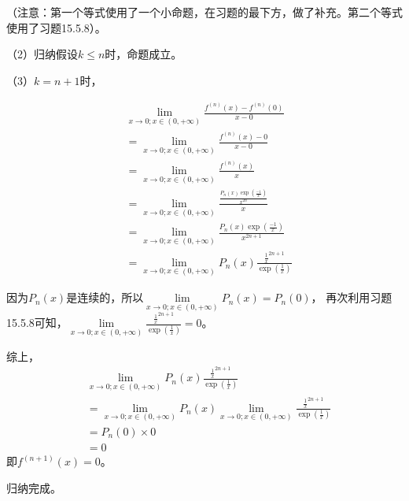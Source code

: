 \documentclass{article}
\begin{document}
\begin{itemize}
\begin{itemize}
                （注意：第一个等式使用了一个小命题，在习题的最下方，做了补充。第二个等式使用了习题15.5.8）。

                （2）归纳假设$k \leq n$时，命题成立。

                （3）$k = n + 1$时，

                \begin{align*}
                   & \lim\limits_{x \to 0; x \in (0, + \infty)} \frac{f^{(n)}(x) - f^{(n)}(0)}{x - 0}                 \\
                   & = \lim\limits_{x \to 0; x \in (0, + \infty)} \frac{f^{(n)}(x) - 0}{x - 0}                        \\
                   & = \lim\limits_{x \to 0; x \in (0, + \infty)} \frac{f^{(n)}(x)}{x}                                \\
                   & = \lim\limits_{x \to 0; x \in (0, + \infty)} \frac{\frac{P_n(x)\exp(\frac{-1}{x})}{x^{2n}}}{x}   \\
                   & = \lim\limits_{x \to 0; x \in (0, + \infty)} \frac{P_n(x)\exp(\frac{-1}{x})}{x^{2n+1}}           \\
                   & = \lim\limits_{x \to 0; x \in (0, + \infty)} P_n(x) \frac{\frac{1}{x}^{2n+1}}{\exp(\frac{1}{x})}
                \end{align*}

                因为$P_n(x)$是连续的，所以$\lim\limits_{x \to 0; x \in (0, + \infty)} P_n(x) = P_n(0)$，
                再次利用习题15.5.8可知，$\lim\limits_{x \to 0; x \in (0, + \infty)} \frac{\frac{1}{x}^{2n+1}}{\exp(\frac{1}{x})} = 0$。

                综上，
                \begin{align*}
                   & \lim\limits_{x \to 0; x \in (0, + \infty)} P_n(x) \frac{\frac{1}{x}^{2n+1}}{\exp(\frac{1}{x})}                                              \\
                   & = \lim\limits_{x \to 0; x \in (0, + \infty)} P_n(x) \lim\limits_{x \to 0; x \in (0, + \infty)} \frac{\frac{1}{x}^{2n+1}}{\exp(\frac{1}{x})} \\
                   & = P_n(0) \times 0                                                                                                                           \\
                   & = 0
                \end{align*}
                即$f^{(n + 1)}(x) = 0$。

                归纳完成。



\end{itemize}
\end{itemize}
\end{document}
